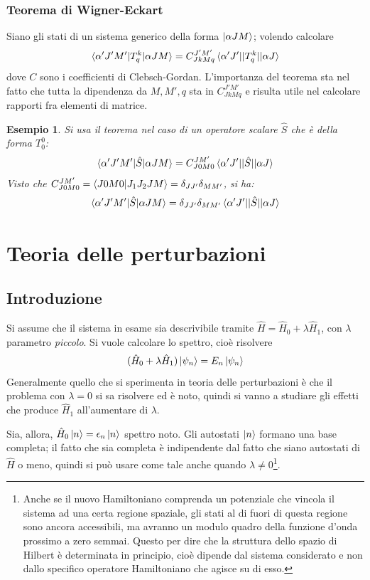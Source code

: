 \documentclass[11pt, a4paper]{scrartcl} %
\numberwithin{equation}{subsection}
\theoremstyle{style2}
\theoremstyle{style1}
\newtheorem{esempio}{Esempio}[section]
\begin{document}
\subsubsection{Teorema di Wigner-Eckart}
Siano gli stati di un sistema generico della forma $\ket{\alpha J M } $; volendo calcolare
\[
\braket{\alpha 'J'M'|T^k_q|\alpha JM} =C^{J'M'}_{JkMq} \braket{\alpha ' J'||T^k_q||\alpha J} 
\] 
dove $C$ sono i coefficienti di Clebsch-Gordan. 
L'importanza del teorema sta nel fatto che tutta la dipendenza da $M,M',q$ sta in $C^{J'M'} _{JkMq} $ e risulta utile nel calcolare rapporti fra elementi di matrice.

\begin{esempio}
	Si usa il teorema nel caso di un operatore scalare $\hat{S}$ che \`e della forma $T^0_0$:
	\[
		\braket{\alpha ' J'M'|\hat{S}|\alpha JM} = C^{JM'} _{J0M0}  \braket{\alpha 'J'||\hat{S} ||\alpha J} 
	\] 
	Visto che $C^{JM'} _{J0M0}=\braket{J 0 M 0|J_1J_2 J M} = \delta _{JJ'}\delta _{MM'}  $, si ha:
	\[
	\braket{\alpha ' J'M'|\hat{S}|\alpha JM} = \delta _{JJ'} \delta_{ MM'} \braket{\alpha 'J'||\hat{S}||\alpha J} 
	\] 
\end{esempio}

\newpage
\section{Teoria delle perturbazioni}

\subsection{Introduzione}

Si assume che il sistema in esame sia descrivibile tramite $\hat{H} = \hat{H}_0 + \lambda \hat{H}_1$, con $\lambda $  parametro \textit{piccolo}.
Si vuole calcolare lo spettro, cio\`e risolvere 
\begin{equation}\label{p1}
	(\hat{H}_0 + \lambda \hat{H}_1 ) \ket{\psi _n} = E_n \ket{\psi _n} 
\end{equation}
Generalmente quello che si sperimenta in teoria delle perturbazioni \`e che il problema con $\lambda = 0$ si sa risolvere ed \`e noto, quindi si vanno a studiare gli effetti che produce $\hat{H}_1$ all'aumentare di $\lambda $.

Sia, allora, $\hat{H}_0 \ket{n} = \epsilon _n \ket{n} $ spettro noto.
Gli autostati $\ket{n} $ formano una base completa; il fatto che sia completa \`e indipendente dal fatto che siano autostati di $\hat{H}$ o meno, quindi si pu\`o usare come tale anche quando $\lambda \neq 0$\footnote{Anche se il nuovo Hamiltoniano comprenda un potenziale che vincola il sistema ad una certa regione spaziale, gli stati al di fuori di questa regione sono ancora accessibili, ma avranno un modulo quadro della funzione d'onda prossimo a zero semmai. Questo per dire che la struttura dello spazio di Hilbert \`e determinata in principio, cio\`e dipende dal sistema considerato e non dallo specifico operatore Hamiltoniano che agisce su di esso.}.
\end{document}
